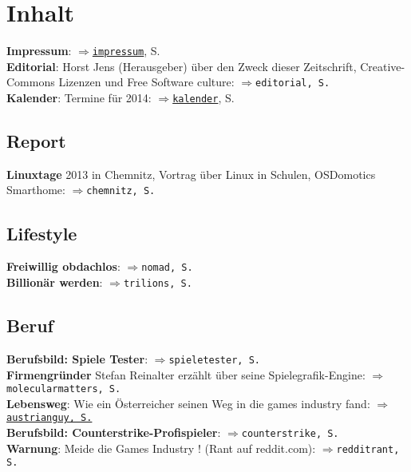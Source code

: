 \section*{Inhalt} 
\label{inhalt}

\textbf{Impressum}: $\Rightarrow$\hyperlink{impressum}{\texttt{impressum}}, S. \pageref{impressum}\\
\textbf{Editorial}: Horst Jens (Herausgeber) über den Zweck dieser Zeitschrift, Creative-Commons Lizenzen und Free Software culture: $\Rightarrow$\texttt{editorial, S. \pageref{editorial}}\\ 
\textbf{Kalender}: Termine für 2014: \hyperlink{kalender}{$\Rightarrow$\texttt{kalender}}, S. \pageref{kalender}

\subsection*{Report}

\textbf{Linuxtage} 2013 in Chemnitz, Vortrag über Linux in Schulen, OSDomotics Smarthome: $\Rightarrow$\texttt{chemnitz, S. \pageref{chemnitz}}\\

\subsection*{Lifestyle}

\textbf{Freiwillig obdachlos}: $\Rightarrow$\texttt{nomad, S. \pageref{nomad}}\\
\textbf{Billionär werden}: $\Rightarrow$\texttt{trilions, S. \pageref{trillions}}\\

\subsection*{Beruf}

\textbf{Berufsbild: Spiele Tester}: $\Rightarrow$\texttt{spieletester, S. \pageref{spieletester}}\\
\textbf{Firmengründer} Stefan Reinalter erzählt über seine Spielegrafik-Engine: $\Rightarrow$\texttt{molecularmatters, S. \pageref{molecularmatters}}\\
\textbf{Lebensweg}: Wie ein Österreicher seinen Weg in die games industry fand: \hyperlink{austrianguy}{$\Rightarrow$\texttt{austrianguy, S.} \pageref{austrianguy}}\\
\textbf{Berufsbild: Counterstrike-Profispieler}: $\Rightarrow$\texttt{counterstrike, S. \pageref{counterstrike}}\\
\textbf{Warnung}: Meide die Games Industry ! (Rant auf reddit.com): $\Rightarrow$\texttt{redditrant, S. \pageref{redditrant}}\\

